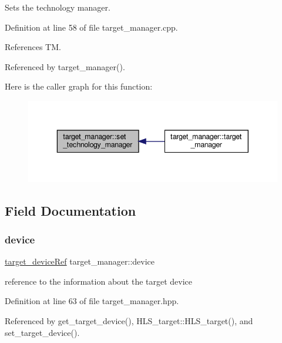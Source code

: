 Sets the technology manager. 



Definition at line 58 of file target\+\_\+manager.\+cpp.



References TM.



Referenced by target\+\_\+manager().

Here is the caller graph for this function\+:
\nopagebreak
\begin{figure}[H]
\begin{center}
\leavevmode
\includegraphics[width=343pt]{da/d43/classtarget__manager_a90e14edbec3c7adda47082b7e13690e2_icgraph}
\end{center}
\end{figure}


\subsection{Field Documentation}
\mbox{\label{classtarget__manager_af678484b7801324da5d10ec140136c7f}} 
\subsubsection{\texorpdfstring{device}{device}}
{\footnotesize\ttfamily \hyperlink{target__device_8hpp_acedb2b7a617e27e6354a8049fee44eda}{target\+\_\+device\+Ref} target\+\_\+manager\+::device\hspace{0.3cm}{\ttfamily [protected]}}



reference to the information about the target device 



Definition at line 63 of file target\+\_\+manager.\+hpp.



Referenced by get\+\_\+target\+\_\+device(), H\+L\+S\+\_\+target\+::\+H\+L\+S\+\_\+target(), and set\+\_\+target\+\_\+device().

